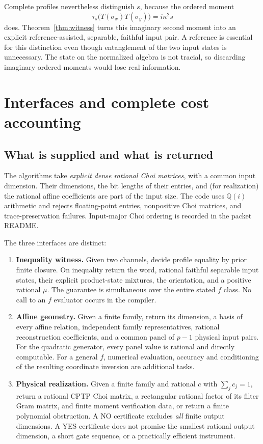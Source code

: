 \documentclass[11pt,a4paper]{article}
\theoremstyle{definition}\newtheorem{definition}[theorem]{Definition}
\newcommand{\Q}{\mathbb Q}
\begin{document}
Complete profiles nevertheless distinguish $s$, because the ordered moment
\[
 \tau_s\big(T(\sigma_x)T(\sigma_y)\big)=i\kappa^2s
\]
does. Theorem~\ref{thm:witness} turns this imaginary second moment into an explicit reference-assisted, separable, faithful input pair. A reference is essential for this distinction even though entanglement of the two input states is unnecessary. The state on the normalized algebra is not tracial, so discarding imaginary ordered moments would lose real information.


\section{Interfaces and complete cost accounting}\label{sec:costs}

\subsection{What is supplied and what is returned}

The algorithms take \emph{explicit dense rational Choi matrices}, with a common input dimension. Their dimensions, the bit lengths of their entries, and (for realization) the rational affine coefficients are part of the input size. The code uses $\Q(i)$ arithmetic and rejects floating-point entries, nonpositive Choi matrices, and trace-preservation failures. Input-major Choi ordering is recorded in the packet README.

The three interfaces are distinct:
\begin{enumerate}
\item \textbf{Inequality witness.} Given two channels, decide profile equality by prior finite closure. On inequality return the word, rational faithful separable input states, their explicit product-state mixtures, the orientation, and a positive rational $\mu$. The guarantee is simultaneous over the entire stated $f$ class. No call to an $f$ evaluator occurs in the compiler.
\item \textbf{Affine geometry.} Given a finite family, return its dimension, a basis of every affine relation, independent family representatives, rational reconstruction coefficients, and a common panel of $p-1$ physical input pairs. For the quadratic generator, every panel value is rational and directly computable. For a general $f$, numerical evaluation, accuracy and conditioning of the resulting coordinate inversion are additional tasks.
\item \textbf{Physical realization.} Given a finite family and rational $c$ with $\sum_jc_j=1$, return a rational CPTP Choi matrix, a rectangular rational factor of its filter Gram matrix, and finite moment verification data, or return a finite polynomial obstruction. A NO certificate excludes \emph{all} finite output dimensions. A YES certificate does not promise the smallest rational output dimension, a short gate sequence, or a practically efficient instrument.
\end{enumerate}
\end{document}
